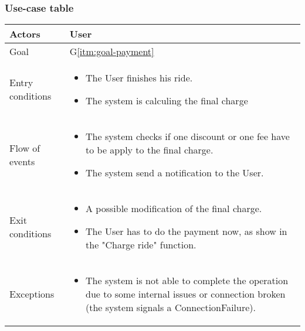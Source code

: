 

\subsubsection{Use-case table}
\begin{center}
  \begin{tabular}{ l | p{10cm} }
    \hline
    Actors & User\\ \hline
    Goal & G\ref{itm:goal-payment}\\ \hline %
    Entry conditions & \begin{itemize}
			\item The User finishes his ride.
			\item The system is calculing the final charge

\end{itemize}  \\ \hline
  Flow of events &
\begin{itemize}
\item The system checks if one discount or one fee have to be apply to the final charge.
\item The system send a notification to the User.
\end{itemize} \\ \hline
    Exit conditions &
\begin{itemize}
	\item A possible modification of the final charge.
  \item The User has to do the payment now, as show in the "Charge ride" function.
\end{itemize}  \\ \hline
  Exceptions & 
\begin{itemize}
  \item The system is not able to complete the operation due to some internal issues or connection broken (the system signals a ConnectionFailure).
\end{itemize} 
\\ \hline
  \end{tabular}
\end{center}


